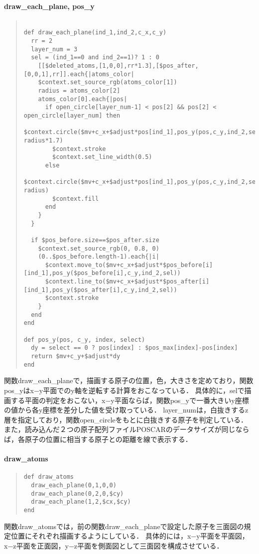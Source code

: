 \paragraph{draw\_each\_plane, pos\_y}\begin{quote}\begin{verbatim}

def draw_each_plane(ind_1,ind_2,c_x,c_y)
  rr = 2
  layer_num = 3
  sel = (ind_1==0 and ind_2==1)? 1 : 0
    [[$deleted_atoms,[1,0,0],rr*1.3],[$pos_after,[0,0,1],rr]].each{|atoms_color|
    $context.set_source_rgb(atoms_color[1])
    radius = atoms_color[2]
    atoms_color[0].each{|pos|
      if open_circle[layer_num-1] < pos[2] && pos[2] < open_circle[layer_num] then
        $context.circle($mv+c_x+$adjust*pos[ind_1],pos_y(pos,c_y,ind_2,sel), radius*1.7)
        $context.stroke
        $context.set_line_width(0.5)
      else
        $context.circle($mv+c_x+$adjust*pos[ind_1],pos_y(pos,c_y,ind_2,sel), radius)
        $context.fill
      end
    }
  }

  if $pos_before.size==$pos_after.size
    $context.set_source_rgb(0, 0.8, 0)
    (0..$pos_before.length-1).each{|i|
      $context.move_to($mv+c_x+$adjust*$pos_before[i][ind_1],pos_y($pos_before[i],c_y,ind_2,sel))
      $context.line_to($mv+c_x+$adjust*$pos_after[i][ind_1],pos_y($pos_after[i],c_y,ind_2,sel))
      $context.stroke
    }
  end
end

def pos_y(pos, c_y, index, select)
  dy = select == 0 ? pos[index] : $pos_max[index]-pos[index]
  return $mv+c_y+$adjust*dy
end
\end{verbatim}\end{quote}
関数draw\_each\_planeで，描画する原子の位置，色，大きさを定めており，関数pos\_yはx−y平面でのy軸を逆転する計算をおこなっている．
具体的に，selで描画する平面の判定をおこない，x−y平面ならば，関数pos\_yで一番大きいy座標の値から各y座標を差分した値を受け取っている．
layer\_numは，白抜きするz層を指定しており，関数open\_circleをもとに白抜きする原子を判定している．
また，読み込んだ２つの原子配列ファイルPOSCARのデータサイズが同じならば，各原子の位置に相当する原子との距離を線で表示する．

\paragraph{draw\_atoms}\begin{quote}\begin{verbatim}
def draw_atoms
  draw_each_plane(0,1,0,0)    
  draw_each_plane(0,2,0,$cy)   
  draw_each_plane(1,2,$cx,$cy) 
end
\end{verbatim}\end{quote}
関数draw\_atomsでは，前の関数draw\_each\_planeで設定した原子を三面図の規定位置にそれぞれ描画するようにしている．
具体的には，x−y平面を平面図，x−z平面を正面図，y−z平面を側面図として三面図を構成させている．

